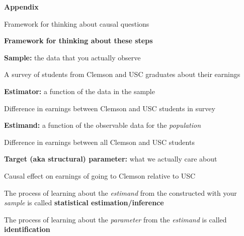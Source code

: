 \documentclass[11pt, aspectratio=169]{beamer}
\newenvironment{wideitemize}{\itemize\addtolength{\itemsep}{5pt}}{\enditemize}
\begin{document}
\appendix

\begin{frame}{\bf \large Appendix}
	
	\huge Framework for thinking about causal questions
\end{frame}

\begin{frame}[label = framework]{\bf \large Framework for thinking about these steps \hyperlink{splitprob}{}}
	
	\begin{wideitemize}
		
		\item \textbf{Sample:} the data that you actually observe
		\begin{wideitemize}
			\item
			A survey of students from Clemson and USC graduates about their earnings 
		\end{wideitemize}
		
		\item \textbf{Estimator:} a function of the data in the sample 
		\begin{wideitemize}
			\item Difference in earnings between Clemson and USC students in survey
		\end{wideitemize}
		
		\item \textbf{Estimand:} a function of the observable data for the \textit{population}
		\begin{wideitemize}
			\item Difference in earnings between all Clemson and USC students 
		\end{wideitemize}
		
		\item \textbf{Target (aka structural) parameter:} what we actually care about
		\begin{wideitemize}
			\item Causal effect on earnings of going to Clemson relative to USC
		\end{wideitemize}
		
	\end{wideitemize}	
	
	\medskip
	\pause
	\begin{wideitemize}
		
		\item The process of learning about the \textit{estimand} from the  constructed with your \textit{sample} is called \textbf{statistical estimation/inference}
		
		\item The process of learning about the \textit{parameter} from the \textit{estimand} is called \textbf{identification}
		
	\end{wideitemize}	
\end{frame}
\end{document}

